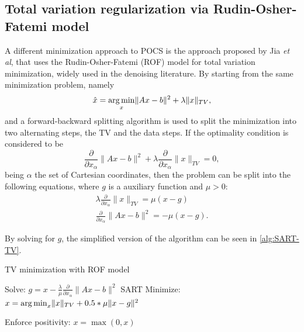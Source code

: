 \subsection{Total variation regularization via Rudin-Osher-Fatemi model} \label{sec:SART-TV}

A different minimization approach to POCS is the approach proposed by Jia \textit{et al}\cite{jia2011gpu}, that uses the Rudin-Osher-Fatemi (ROF) model for total variation minimization, widely used in the denoising literature\cite{RUDIN}\cite{duran2013chambolle}\cite{vogel1996iterative}. By starting from the same minimization problem, namely
\begin{equation}
\hat{x}=\mathop{\mathrm{arg\,min}}_x \lVert Ax-b \rVert^2+\lambda \lVert x\rVert_{TV},
\end{equation}
and a forward-backward splitting algorithm\cite{combettes2005signal} is used to split the minimization into two alternating steps, the TV and the data steps. If the optimality condition is considered to be
\begin{equation}
\frac{\partial}{\partial x_\alpha}\lVert Ax-b \rVert^2+\lambda\frac{\partial}{\partial x_\alpha}\lVert x\rVert_{TV}=0,
\end{equation}
being $\alpha$ the set of Cartesian coordinates, then the problem can be split into the following equations, where $g$ is a auxiliary function and $\mu>0$:
\begin{align}
\lambda\frac{\partial}{\partial x_\alpha}\lVert x\rVert_{TV}=\mu (x-g)\\
\frac{\partial}{\partial x_\alpha}\lVert Ax-b \rVert^2=-\mu (x-g).
\end{align}

By solving for $g$, the simplified version of the algorithm can be seen in \ref{alg:SART-TV}.

\begin{algorithm}
\caption{TV minimization with ROF model
\label{alg:SART-TV}}
\begin{algorithmic}[1]
\State Solve: $g=x-\frac{\lambda}{\mu} \frac{\partial}{\partial x_\alpha}\lVert Ax-b \rVert^2$
\Comment SART
\State Minimize: $x=\mathop{\mathrm{arg\,min}}_x  \lVert x\rVert_{TV}+0.5*\mu \lVert x-g \rVert^2$

\State Enforce positivity: $x=\max(0,x) $
\end{algorithmic}

\end{algorithm}

